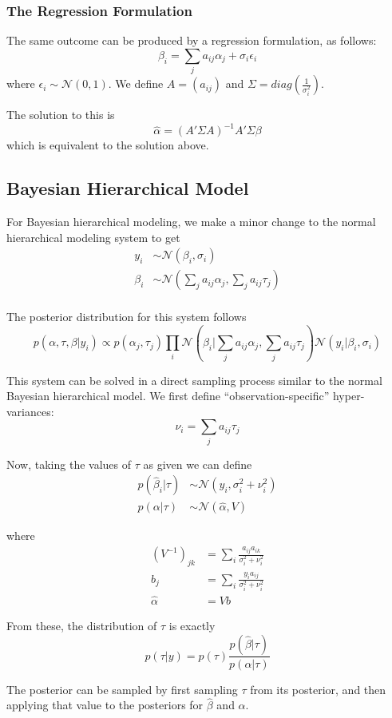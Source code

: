 \documentclass[12pt, oneside]{amsart}
\begin{document}
\subsubsection{The Regression Formulation}

The same outcome can be produced by a regression formulation, as
follows:
\[
\beta_i = \sum_j a_{ij} \alpha_j + \sigma_i \epsilon_i
\]
where $\epsilon_i \sim \mathcal{N}(0, 1)$.  We define $A =
\left(a_{ij}\right)$ and $\Sigma = diag\left(\frac{1}{\sigma_i^2}\right)$.

The solution to this is
\[
\hat\alpha = \left(A' \Sigma A\right)^{-1} A' \Sigma \beta
\]
which is equivalent to the solution above.

\subsection{Bayesian Hierarchical Model}

For Bayesian hierarchical modeling, we make a minor change to the
normal hierarchical modeling system to get
\begin{align*}
  y_i & \sim \mathcal{N}\left(\beta_i, \sigma_i\right) \\
  \beta_i & \sim \mathcal{N}\left(\sum_j a_{ij} \alpha_j, \sum_j a_{ij} \tau_j\right) \\
\end{align*}

The posterior distribution for this system follows
\[
p(\alpha, \tau, \beta | y_i) \propto
p(\alpha_j, \tau_j) \prod_i \mathcal{N}\left(\beta_i | \sum_j
  a_{ij} \alpha_j, \sum_j a_{ij} \tau_j\right)
\mathcal{N}\left(y_i | \beta_i, \sigma_i\right)
\]

This system can be solved in a direct sampling process similar to the normal
Bayesian hierarchical model.  We first define ``observation-specific''
hyper-variances:
\[
\nu_i = \sum_j a_{ij} \tau_j
\]

Now, taking the values of $\tau$ as given we can define
\begin{align*}
  p(\hat\beta_i | \tau) & \sim \mathcal{N}\left(y_i, \sigma_i^2 +
                              \nu_i^2\right) \\
  p(\alpha | \tau) & \sim \mathcal{N}\left(\hat\alpha, V\right)
\end{align*}

where
\begin{align*}
  \left(V^{-1}\right)_{jk} &= \sum_i \frac{a_{ij} a_{ik}}{\sigma_i^2 +
                             \nu_i^2} \\
  b_j &= \sum_i \frac{y_i a_{ij}}{\sigma_i^2 + \nu_i^2} \\
  \hat\alpha &= V b
\end{align*}

From these, the distribution of $\tau$ is exactly
\[
p(\tau | y) = p(\tau) \frac{p(\hat\beta | \tau)}{p(\alpha | \tau)}
\]

The posterior can be sampled by first sampling $\tau$ from its
posterior, and then applying that value to the posteriors for
$\hat\beta$ and $\alpha$.
\end{document}
